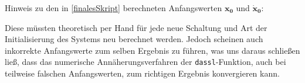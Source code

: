 Hinweis zu den in \ref{finalesSkript} berechneten Anfangswerten $\mathbf{x_0}$ und $\mathbf{\dot{x}_0}$:

Diese müssten theoretisch per Hand für jede neue Schaltung und Art der Initialisierung des Systems neu berechnet werden. Jedoch scheinen auch inkorrekte Anfangswerte zum selben Ergebnis zu führen, was uns daraus schließen ließ, dass das numerische Annäherungsverfahren der \texttt{dassl}-Funktion, auch bei teilweise falschen Anfangswerten, zum richtigen Ergebnis konvergieren kann.
